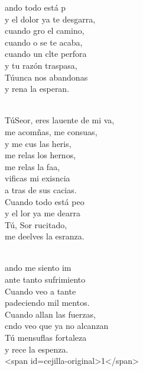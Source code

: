 \documentclass[12pt]{article}
\begin{document}
\begin{multicols*}{2}
\begin{cancion}%
	ando todo está p\\
y el dolor ya te desgarra,\\
	cuando gro el camino, \\
	cuando o se te acaba,\\
	cuando un clte perfora \\
	y tu razón traspasa,\\
	Túunca nos abandonas \\
	y rena la esperan.\\\jump\\
	\begin{chorus}%
	TúSeor, eres lauente de mi va, \\
	me acomñas, me consuas,\\
	y me cus las heris,\\
	me relas los hernos, \\
	me relas la faa,\\
	vificas mi exisncia\\
	a tras de sus cacias. \\
	Cuando todo está peo\\
	y el lor ya me dearra\\
	Tú, Sor rucitado, \\
	me deelves la esranza.\\
	\end{chorus}%
	\jump\\
	ando me siento im\\
ante tanto sufrimiento\\
	Cuando veo a tante\\
	padeciendo mil mentos.\\
	Cuando allan las fuerzas,\\
	cndo veo que ya no alcanzan\\
	Tú mensuflas fortaleza \\
	y rece la espenza.\\
<span id=cejilla-original>1</span>\\
\end{cancion}%


\end{multicols*}
\end{document}
